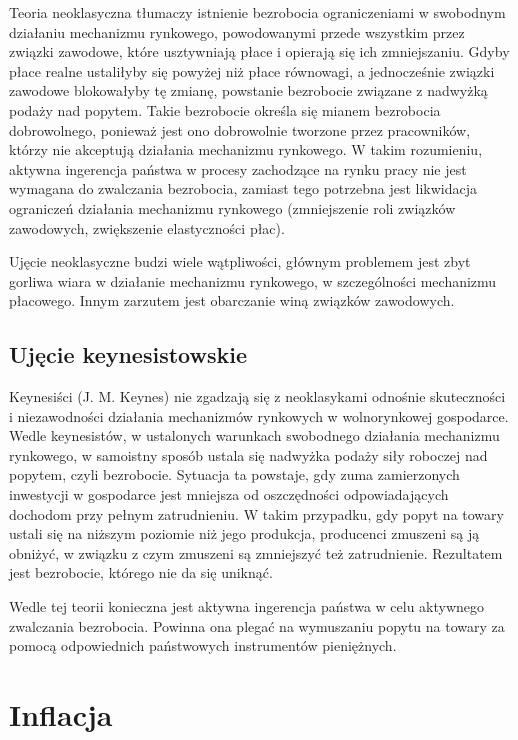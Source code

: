 \documentclass[12pt]{extarticle}
\begin{document}
Teoria neoklasyczna tłumaczy istnienie bezrobocia ograniczeniami w swobodnym działaniu mechanizmu rynkowego, powodowanymi przede wszystkim przez związki zawodowe, które usztywniają płace i opierają się ich zmniejszaniu. Gdyby płace realne ustaliłyby się powyżej niż płace równowagi, a jednocześnie związki zawodowe blokowałyby tę zmianę, powstanie bezrobocie związane z nadwyżką podaży nad popytem. Takie bezrobocie określa się mianem bezrobocia dobrowolnego, ponieważ jest ono dobrowolnie tworzone przez pracowników, którzy nie akceptują działania mechanizmu rynkowego. W takim rozumieniu, aktywna ingerencja państwa w procesy zachodzące na rynku pracy nie jest wymagana do zwalczania bezrobocia, zamiast tego potrzebna jest likwidacja ograniczeń działania mechanizmu rynkowego (zmniejszenie roli związków zawodowych, zwiększenie elastyczności płac).

Ujęcie neoklasyczne budzi wiele wątpliwości, głównym problemem jest zbyt gorliwa wiara w działanie mechanizmu rynkowego, w szczególności mechanizmu płacowego. Innym zarzutem jest obarczanie winą związków zawodowych.


\subsection{Ujęcie keynesistowskie}

Keynesiści (J. M. Keynes) nie zgadzają się z neoklasykami odnośnie skuteczności i niezawodności działania mechanizmów rynkowych w wolnorynkowej gospodarce. Wedle keynesistów, w ustalonych warunkach swobodnego działania mechanizmu rynkowego, w samoistny sposób ustala się nadwyżka podaży siły roboczej nad popytem, czyli bezrobocie. Sytuacja ta powstaje, gdy zuma zamierzonych inwestycji w gospodarce jest mniejsza od oszczędności odpowiadających dochodom przy pełnym zatrudnieniu. W takim przypadku, gdy popyt na towary ustali się na niższym poziomie niż jego produkcja, producenci zmuszeni są ją obniżyć, w związku z czym zmuszeni są zmniejszyć też zatrudnienie. Rezultatem jest bezrobocie, którego nie da się uniknąć.

Wedle tej teorii konieczna jest aktywna ingerencja państwa w celu aktywnego zwalczania bezrobocia. Powinna ona plegać na wymuszaniu popytu na towary za pomocą odpowiednich państwowych instrumentów pieniężnych.

\section{Inflacja}
\end{document}
